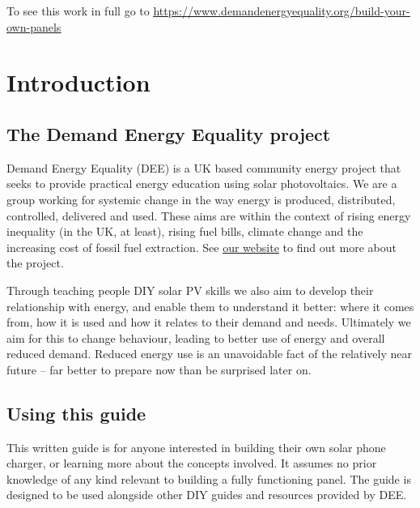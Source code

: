 \documentclass{article}
\theoremstyle{definition}
\theoremstyle{definition}
\theoremstyle{remark}
\begin{document}
    To see this work in full go to \href{https://www.demandenergyequality.org/build-your-own-panels}{\underline{https://www.demandenergyequality.org/build-your-own-panels}}
  


\newpage

{\color{blue}\section{Introduction}} %
\label{sec:introduction}

  {\color{blue}\subsection{The Demand Energy Equality project}} %
  \label{sub:the_demand_energy_equality_project}

    Demand Energy Equality (DEE) is a UK based community energy project that seeks to provide practical energy education using solar photovoltaics. We are a group working for systemic change in the way energy is produced, distributed, controlled, delivered and used. These aims are within the context of rising energy inequality (in the UK, at least), rising fuel bills, climate change and the increasing cost of fossil fuel extraction. See \href{https://www.demandenergyequality.org/about/}{\underline{our website}} to find out more about the project.

    Through teaching people DIY solar PV skills we also aim to develop their relationship with energy, and enable them to understand it better: where it comes from, how it is used and how it relates to their demand and needs. Ultimately we aim for this to change behaviour, leading to better use of energy and overall reduced demand. Reduced energy use is an unavoidable fact of the relatively near future – far better to prepare now than be surprised later on.

  
  {\color{blue}\subsection{Using this guide}} %
  \label{sub:using_this_guide}

    This written guide is for anyone interested in building their own solar phone charger, or learning more about the concepts involved. It assumes no prior knowledge of any kind relevant to building a fully functioning panel. The guide is designed to be used alongside other DIY guides and resources provided by DEE. 
\end{document}

